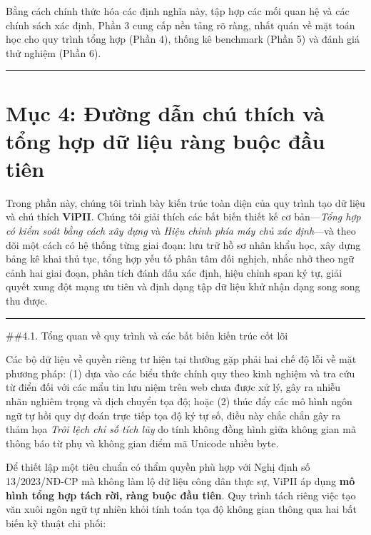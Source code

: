 \documentclass[
  11pt,
  a4paper,
]{article}
\begin{document}
Bằng cách chính thức hóa các định nghĩa này, tập hợp các mối quan hệ và
các chính sách xác định, Phần 3 cung cấp nền tảng rõ ràng, nhất quán về
mặt toán học cho quy trình tổng hợp (Phần 4), thống kê benchmark (Phần
5) và đánh giá thử nghiệm (Phần 6).

\begin{center}\rule{0.5\linewidth}{0.5pt}\end{center}

\section{Mục 4: Đường dẫn chú thích và tổng hợp dữ liệu ràng buộc đầu
tiên}\label{mux1ee5c-4-ux111ux1b0ux1eddng-dux1eabn-chuxfa-thuxedch-vuxe0-tux1ed5ng-hux1ee3p-dux1eef-liux1ec7u-ruxe0ng-buux1ed9c-ux111ux1ea7u-tiuxean}

Trong phần này, chúng tôi trình bày kiến \hspace{0pt}\hspace{0pt}trúc
toàn diện của quy trình tạo dữ liệu và chú thích \textbf{ViPII}. Chúng
tôi giải thích các bất biến thiết kế cơ bản---\emph{Tổng hợp có kiểm
soát bằng cách xây dựng} và \emph{Hiệu chỉnh phía máy chủ xác định}---và
theo dõi một cách có hệ thống từng giai đoạn: lưu trữ hồ sơ nhân khẩu
học, xây dựng bảng kê khai thủ tục, tổng hợp yếu tố phân tâm đối nghịch,
nhắc nhở theo ngữ cảnh hai giai đoạn, phân tích đánh dấu xác định, hiệu
chỉnh span ký tự, giải quyết xung đột mạng ưu tiên và định dạng tập dữ
liệu khử nhận dạng song song thu được.

\begin{center}\rule{0.5\linewidth}{0.5pt}\end{center}

\#\#4.1. Tổng quan về quy trình và các bất biến kiến
\hspace{0pt}\hspace{0pt}trúc cốt lõi

Các bộ dữ liệu về quyền riêng tư hiện tại thường gặp phải hai chế độ lỗi
về mặt phương pháp: (1) dựa vào các biểu thức chính quy theo kinh nghiệm
và tra cứu từ điển đối với các mẩu tin lưu niệm trên web chưa được xử
lý, gây ra nhiễu nhãn nghiêm trọng và dịch chuyển tọa độ; hoặc (2) thúc
đẩy các mô hình ngôn ngữ tự hồi quy dự đoán trực tiếp tọa độ ký tự số,
điều này chắc chắn gây ra thảm họa \emph{Trôi lệch chỉ số tích lũy} do
tính không đồng hình giữa không gian mã thông báo từ phụ và không gian
điểm mã Unicode nhiều byte.

Để thiết lập một tiêu chuẩn có thẩm quyền phù hợp với Nghị định số
13/2023/NĐ-CP mà không làm lộ dữ liệu công dân thực sự, ViPII áp dụng
\textbf{mô hình tổng hợp tách rời, ràng buộc đầu tiên}. Quy trình tách
riêng việc tạo văn xuôi ngôn ngữ tự nhiên khỏi tính toán tọa độ không
gian thông qua hai bất biến kỹ thuật chi phối:
\end{document}
